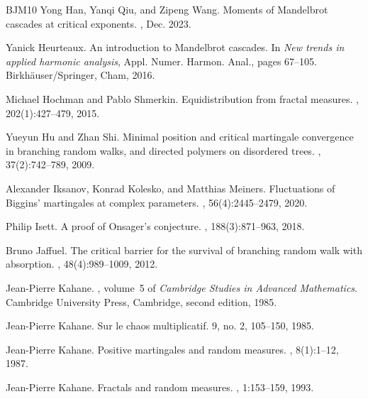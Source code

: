 \documentclass[12pt]{amsart}
\theoremstyle{definition}
\theoremstyle{remark}
\numberwithin{equation}{section}
\begin{document}
\begin{thebibliography}{BJM10}
	Yong Han, Yanqi Qiu, and Zipeng Wang.
	\newblock Moments of {M}andelbrot cascades at critical exponents.
	, Dec. 2023.
	
	
	Yanick Heurteaux.
	\newblock An introduction to {M}andelbrot cascades.
	\newblock In {\em New trends in applied harmonic analysis}, Appl. Numer.
	Harmon. Anal., pages 67--105. Birkh\"{a}user/Springer, Cham, 2016.
	
	
	
	Michael Hochman and Pablo Shmerkin.
	\newblock Equidistribution from fractal measures.
	, 202(1):427--479, 2015.
	
	Yueyun Hu and Zhan Shi.
	\newblock Minimal position and critical martingale convergence in branching
	random walks, and directed polymers on disordered trees.
	, 37(2):742--789, 2009.
	
	
	Alexander Iksanov, Konrad Kolesko, and Matthias Meiners.
	\newblock Fluctuations of {B}iggins' martingales at complex parameters.
	, 56(4):2445--2479,
	2020.
	
	Philip Isett.
	\newblock A proof of {O}nsager's conjecture.
	, 188(3):871--963, 2018.
	
	
	
	
	Bruno Jaffuel.
	\newblock The critical barrier for the survival of branching random walk with
	absorption.
	, 48(4):989--1009,
	2012.
	
	
	
	Jean-Pierre Kahane.
	, volume~5 of {\em Cambridge
		Studies in Advanced Mathematics}.
	\newblock Cambridge University Press, Cambridge, second edition, 1985.
	
	Jean-Pierre Kahane.
	\newblock Sur le chaos multiplicatif.
	 9, no. 2,
	105–150, 1985.
	
	Jean-Pierre Kahane.
	\newblock Positive martingales and random measures.
	, 8(1):1--12, 1987.
	
	
	Jean-Pierre Kahane.
	\newblock Fractals and random measures. 
	, 1:153--159, 1993. 
	

\end{thebibliography}
\end{document}
